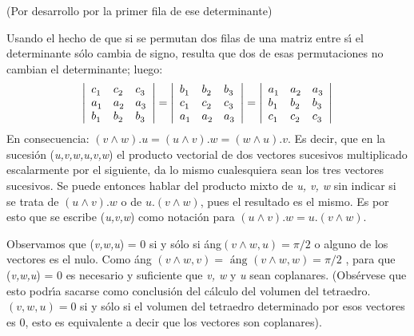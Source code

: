 \begin{center}
(Por desarrollo por la primer fila de ese determinante)
\end{center}
Usando el hecho de que si se permutan dos filas de una matriz
entre s\'{\i} el determinante s\'{o}lo cambia de signo, resulta
que dos de esas permutaciones no cambian el determinante; luego:
\[
\left| {{\begin{array}{*{20}c}
  {c_{1}^{} } \hfill & {c_{2}^{} } \hfill & {c_{3}^{} } \hfill  \\
  {a_{1}^{} } \hfill & {a_{2}^{} } \hfill & {a_{3}^{} } \hfill  \\
  {b_{1}^{} } \hfill & {b_{2}^{} } \hfill & {b_{3}^{} } \hfill  \\
\end{array} }} \right| = \left| {{\begin{array}{*{20}c}
  {b_{1}^{} } \hfill & {b_{2}^{} } \hfill & {b_{3}^{} } \hfill  \\
  {c_{1}^{} } \hfill & {c_{2}^{} } \hfill & {c_{3}^{} } \hfill  \\
  {a_{1}^{} } \hfill & {a_{2}^{} } \hfill & {a_{3}^{} } \hfill  \\
\end{array} }} \right| = \left| {{\begin{array}{*{20}c}
  {a_{1}^{} } \hfill & {a_{2}^{} } \hfill & {a_{3}^{} } \hfill  \\
  {b_{1}^{} } \hfill & {b_{2}^{} } \hfill & {b_{3}^{} } \hfill  \\
  {c_{1}^{} } \hfill & {c_{2}^{} } \hfill & {c_{3}^{} } \hfill  \\
\end{array} }} \right|
\]
En consecuencia: $\left( {v \wedge w} \right).u = \left( {u \wedge
v} \right).w = \left( {w \wedge u} \right).v$. Es decir, que en la
sucesi\'{o}n (\textit{u,v,w,u,v,w}) el producto vectorial de dos
vectores sucesivos multiplicado escalarmente por el siguiente, da
lo mismo cualesquiera sean los tres vectores sucesivos. Se puede
entonces hablar del producto mixto de \textit{u, v, w} sin indicar
si se trata de $\left( {u \wedge v} \right).w$ o de $u.\left( {v
\wedge w} \right)$, pues el resultado es el mismo. Es por esto que
se escribe (\textit{u,v,w}) como notaci\'{o}n para $\left( {u
\wedge v} \right).w = u.\left( {v \wedge w} \right)$.

Observamos que (\textit{v,w,u}) = 0 si y s\'{o}lo si
\'{a}ng$\left( {v \wedge w,u} \right) = \pi /2$ o alguno de los
vectores es el nulo. Como \'{a}ng $\left( {v \wedge w,v} \right) =
\,\,\mbox{\'{a}ng}\,\,\left( {v \wedge w,w} \right) = \pi /2$ ,
para que (\textit{v,w,u}) = 0 es necesario y suficiente que
\textit{v, w} y \textit{u} sean coplanares. (Obs\'{e}rvese que
esto podr\'{\i}a sacarse como conclusi\'{o}n del c\'{a}lculo del
volumen del tetraedro. $(v,w,u) = 0$ si y s\'{o}lo si el volumen
del tetraedro determinado por esos vectores es 0, esto es
equivalente a decir que los vectores son coplanares).
\bigskip

